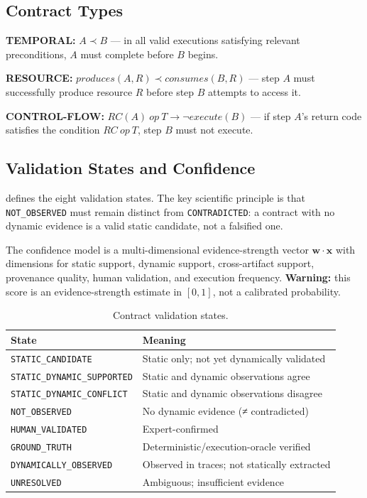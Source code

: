 \documentclass[sigconf,anonymous,review]{acmart}
\newcommand{\notobs}{\texttt{NOT\_OBSERVED}\xspace}
\begin{document}
\subsection{Contract Types}

\textbf{TEMPORAL:} $A \prec B$ — in all valid executions satisfying relevant
preconditions, $A$ must complete before $B$ begins.

\textbf{RESOURCE:} $\mathit{produces}(A, R) \prec \mathit{consumes}(B, R)$ — step
$A$ must successfully produce resource $R$ before step $B$ attempts to access it.

\textbf{CONTROL-FLOW:} $\mathit{RC}(A)\ op\ T \to \neg\mathit{execute}(B)$ — if
step $A$'s return code satisfies the condition $\mathit{RC}\ op\ T$, step $B$ must
not execute.

\subsection{Validation States and Confidence}

 defines the eight validation states.
The key scientific principle is that \notobs must remain distinct from
\texttt{CONTRADICTED}: a contract with no dynamic evidence is a valid static
candidate, not a falsified one.

The confidence model is a multi-dimensional evidence-strength vector
$\boldsymbol{w} \cdot \boldsymbol{x}$ with dimensions for static support, dynamic
support, cross-artifact support, provenance quality, human validation, and execution
frequency.
\textbf{Warning:} this score is an evidence-strength estimate in $[0,1]$, not a
calibrated probability.

\begin{table}[t]
\small\centering
\caption{Contract validation states.}\label{table:states}
\begin{tabular}{ll}
\toprule
State & Meaning \\
\midrule
\texttt{STATIC\_CANDIDATE}         & Static only; not yet dynamically validated \\
\texttt{STATIC\_DYNAMIC\_SUPPORTED} & Static and dynamic observations agree \\
\texttt{STATIC\_DYNAMIC\_CONFLICT}  & Static and dynamic observations disagree \\
\texttt{NOT\_OBSERVED}             & No dynamic evidence (≠ contradicted) \\
\texttt{HUMAN\_VALIDATED}          & Expert-confirmed \\
\texttt{GROUND\_TRUTH}             & Deterministic/execution-oracle verified \\
\texttt{DYNAMICALLY\_OBSERVED}     & Observed in traces; not statically extracted \\
\texttt{UNRESOLVED}                & Ambiguous; insufficient evidence \\
\bottomrule
\end{tabular}
\end{table}
\end{document}
